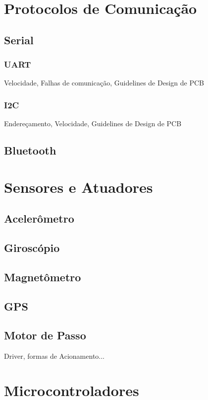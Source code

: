 \section{Protocolos de Comunicação}

\subsection{Serial}
\subsubsection{UART}
Velocidade, Falhas de comunicação, Guidelines de Design de PCB

\subsubsection{I2C}

Endereçamento, Velocidade, Guidelines de Design de PCB

\subsection{Bluetooth}

\section{Sensores e Atuadores}

\subsection{Acelerômetro}
\subsection{Giroscópio}
\subsection{Magnetômetro}

\subsection{GPS}

\subsection{Motor de Passo}

Driver, formas de Acionamento...

\section{Microcontroladores}

